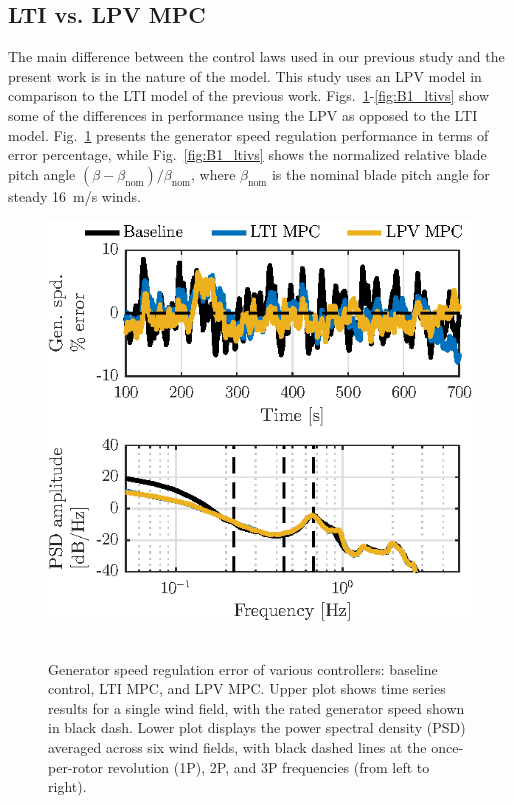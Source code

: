 \documentclass[letterpaper, 10 pt, conference]{ieeeconf}  %
\begin{document}
\subsection{LTI vs. LPV MPC}
The main difference between the control laws used in our previous study \cite{Sinner2018} and the present work is in the nature of the model. This study uses an LPV model in comparison to the LTI model of the previous work. Figs.~\ref{fig:GS_ltivs}-\ref{fig:B1_ltivs} show some of the differences in performance using the LPV as opposed to the LTI model. Fig.~\ref{fig:GS_ltivs} presents the generator speed regulation performance in terms of error percentage, while Fig.~\ref{fig:B1_ltivs} shows the normalized relative blade pitch angle $\left(\beta - \beta_\mathrm{nom}\right)/ \beta_\mathrm{nom}$, where $\beta_\mathrm{nom}$ is the nominal blade pitch angle for steady 16~m/s winds.
\begin{figure}[thbp]
	\centering
	\mbox{\includegraphics[scale=1.0]{GS_ltivs.eps}
	}
	\caption{Generator speed regulation error of various controllers: baseline control, LTI MPC, and LPV MPC. Upper plot shows time series results for a single wind field, with the rated generator speed shown in black dash. Lower plot displays the power spectral density (PSD) averaged across six wind fields, with black dashed lines at the once-per-rotor revolution (1P), 2P, and 3P frequencies (from left to right).}
	\label{fig:GS_ltivs}
\end{figure}
\end{document}
